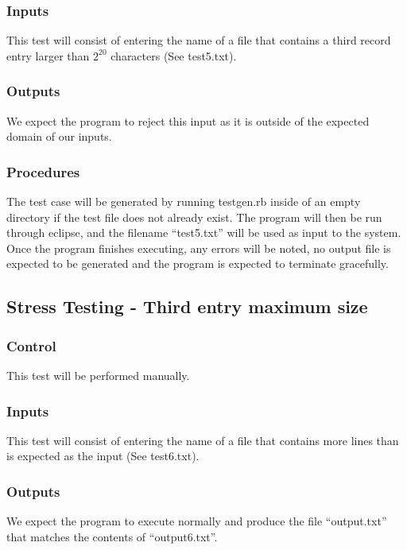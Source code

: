 \documentclass[]{article}
\begin{document}
	\subsubsection{Inputs}
	This test will consist of entering the name of a file that contains a third
	record entry larger than $2^{20}$ characters (See test5.txt).
	
	\subsubsection{Outputs}
	We expect the program to reject this input as it is outside of the expected
	domain of our inputs.
	
	\subsubsection{Procedures}
	The test case will be generated by running testgen.rb inside of an empty
	directory if the test file does not already exist.  The program will then be
	run through eclipse, and the filename ``test5.txt'' will be used as input to
	the system.  Once the program finishes executing, any errors will be noted, 
	no output file is expected to be generated and the program is expected to
	terminate gracefully.
	

\subsection{Stress Testing - Third entry maximum size}
	\subsubsection{Control}
	This test will be performed manually.
	
	\subsubsection{Inputs}
	This test will consist of entering the name of a file that contains more lines
	than is expected as the input (See test6.txt).
	
	\subsubsection{Outputs}
	We expect the program to execute normally and produce the file ``output.txt''
	that matches the contents of ``output6.txt''.
	
\end{document}

